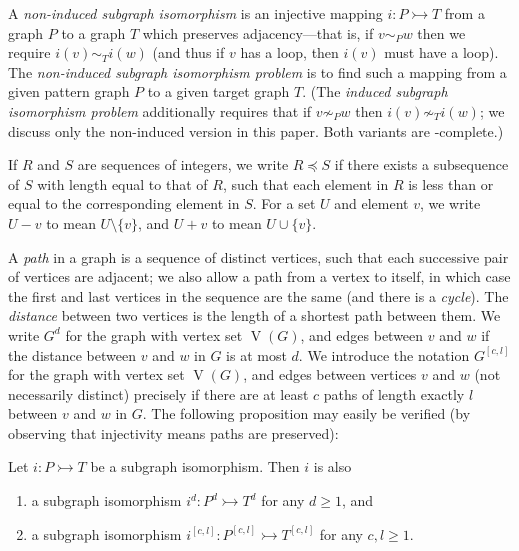 \documentclass{llncs}
\begin{document}
A \emph{non-induced subgraph isomorphism} is an injective mapping $i : P \rightarrowtail T$ from a
graph $P$ to a graph $T$ which preserves adjacency---that is, if $v \sim_{P} w$ then we require
$i(v) \sim_{T} i(w)$ (and thus if $v$ has a loop, then $i(v)$ must have a loop). The
\emph{non-induced subgraph isomorphism problem} is to find such a mapping from a given pattern graph
$P$ to a given target graph $T$.  (The \emph{induced subgraph isomorphism problem} additionally
requires that if $v \not\sim_{P} w$ then $i(v) \not\sim_{T} i(w)$; we discuss only the non-induced
version in this paper. Both variants are \NP-complete.)

If $R$ and $S$ are sequences of integers, we write $R \preceq S$ if there exists a subsequence of
$S$ with length equal to that of $R$, such that each element in $R$ is less than or equal to the
corresponding element in $S$.  For a set $U$ and element $v$, we write $U - v$ to mean $U \setminus
\{ v \}$, and $U + v$ to mean $U \cup \{ v \}$.

A \emph{path} in a graph is a sequence of distinct vertices, such that each successive pair of
vertices are adjacent; we also allow a path from a vertex to itself, in which case the first and
last vertices in the sequence are the same (and there is a \emph{cycle}). The \emph{distance}
between two vertices is the length of a shortest path between them. We write $G^d$ for the graph
with vertex set $\operatorname{V}(G)$, and edges between $v$ and $w$ if the distance between $v$ and
$w$ in $G$ is at most $d$.  We introduce the notation $G^{\left[c, l\right]}$ for the graph with
vertex set $\operatorname{V}(G)$, and edges between vertices $v$ and $w$ (not necessarily distinct)
precisely if there are at least $c$ paths of length exactly $l$ between $v$ and $w$ in $G$. The
following proposition may easily be verified (by observing that injectivity means paths are
preserved):

\begin{proposition}\label{proposition:supplemental}
    Let $i : P \rightarrowtail T$ be a subgraph isomorphism. Then $i$ is also
    \begin{enumerate}[itemindent=1em,topsep=2pt,itemsep=0.2pt]
        \item a subgraph isomorphism $i^d : P^d \rightarrowtail T^d$ for any $d \ge 1$, and
        \item a subgraph isomorphism $i^{\left[c, l\right]} : P^{\left[c, l\right]} \rightarrowtail
            T^{\left[c, l\right]}$ for any $c, l \ge 1$.
    \end{enumerate}
\end{proposition}
\end{document}
